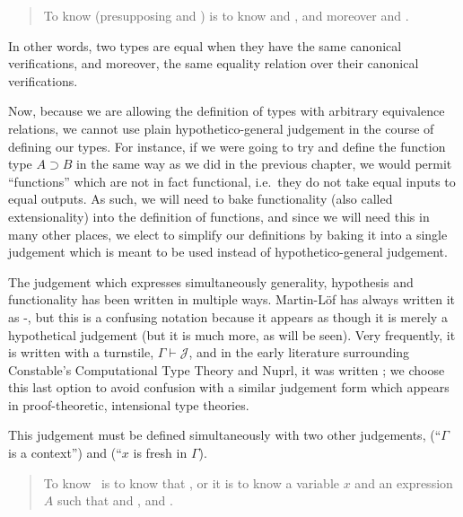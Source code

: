 \documentclass[main.tex]{subfiles}
\begin{document}
\begin{quote}
  To know  (presupposing  and ) is to know
 and
, and moreover
 and
.
\end{quote}

In other words, two types are equal when they have the same canonical
verifications, and moreover, the same equality relation over their canonical
verifications.

Now, because we are allowing the definition of types with arbitrary equivalence
relations, we cannot use plain hypothetico-general judgement in the course of
defining our types. For instance, if we were going to try and define the
function type $A\supset B$ in the same way as we did in the previous chapter,
we would permit ``functions'' which are not in fact functional, i.e.\ they do
not take equal inputs to equal outputs. As such, we will need to bake
functionality (also called extensionality) into the definition of functions,
and since we will need this in many other places, we elect to simplify our
definitions by baking it into a single judgement which is meant to be used
instead of hypothetico-general judgement.

The judgement which expresses simultaneously generality, hypothesis and
functionality has been written in multiple ways. Martin-L\"of has always
written it as \hyp{}{\Gamma}, but this is a confusing notation
because it appears as though it is merely a hypothetical judgement (but it is
much more, as will be seen). Very frequently, it is written with a turnstile,
$\Gamma\vdash\mathcal{J}$, and in the early literature surrounding Constable's
Computational Type Theory and Nuprl, it was written
; we choose this last option to avoid
confusion with a similar judgement form which appears in proof-theoretic,
intensional type theories.

This judgement must be defined simultaneously with two other judgements,
\framebox{\isctx{\Gamma}} (``$\Gamma$ is a context'') and
 (``$x$ is fresh in $\Gamma$).

\begin{quote}
  To know \isctx\Gamma\ is to know that \reduce{\Gamma}{\cdot}, or it is to know
  a variable $x$ and an expression $A$ such that 
  and , and .
\end{quote}
\end{document}

